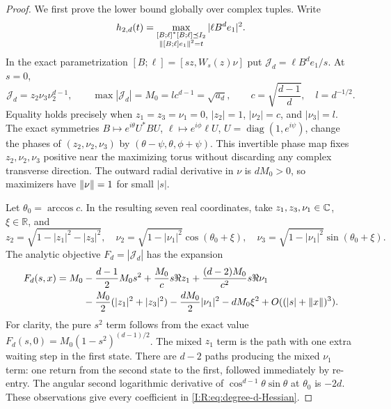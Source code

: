 \begin{proof}
We first prove the lower bound globally over complex tuples.  Write
\[
 h_{2,d}(t)=\max_{\substack{[B;\ell]^*[B;\ell]\preceq I_2\\
                       \left\lVert[B;\ell]e_1\right\rVert^2=t}}
                         |\ell B^d e_1|^2.
\]
In the exact parametrization
$[B;\ell]=[sz,W_s(z)\nu]$ put
$\mathcal J_d=\ell B^de_1/s$.  At $s=0$,
\[
 \mathcal J_d=z_2\nu_3\nu_2^{d-1},\qquad
 \max|\mathcal J_d|=M_0=lc^{d-1}=\sqrt{a_d},\qquad
 c=\sqrt{\frac{d-1}{d}},\quad l=d^{-1/2}.
\]
Equality holds precisely when $z_1=z_3=\nu_1=0$,
$|z_2|=1$, $|\nu_2|=c$, and $|\nu_3|=l$.
The exact symmetries
$B\mapsto e^{i\theta}U^*BU$, $\ell\mapsto e^{i\phi}\ell U$,
$U=\operatorname{diag}(1,e^{i\psi})$, change the phases of
$(z_2,\nu_2,\nu_3)$ by
$(\theta-\psi,\theta,\phi+\psi)$.  This invertible phase map fixes
$z_2,\nu_2,\nu_3$ positive near the maximizing torus without discarding
any complex transverse direction.  The outward
radial derivative in $\nu$ is $dM_0>0$, so maximizers have
$\left\lVert\nu\right\rVert=1$ for small $|s|$.

Let $\theta_0=\arccos c$.  In the resulting seven real coordinates,
take $z_1,z_3,\nu_1\in\mathbb C$, $\xi\in\mathbb R$, and
\[
 z_2=\sqrt{1-|z_1|^2-|z_3|^2},\quad
 \nu_2=\sqrt{1-|\nu_1|^2}\cos(\theta_0+\xi),\quad
 \nu_3=\sqrt{1-|\nu_1|^2}\sin(\theta_0+\xi).
\]
The analytic objective $F_d=|\mathcal J_d|$ has the expansion
\begin{align}
 F_d(s,x)=M_0
 &-\frac{d-1}{2}M_0s^2
   +\frac{M_0}{c}s\Re z_1
   +\frac{(d-2)M_0}{c^2}s\Re\nu_1\notag\\
 &-\frac{M_0}{2}(|z_1|^2+|z_3|^2)
   -\frac{dM_0}{2}|\nu_1|^2-dM_0\xi^2
   +O((|s|+\left\lVert x\right\rVert)^3).
 \label{I:R:eq:degree-d-Hessian}
\end{align}
For clarity, the pure $s^2$ term follows from the exact value
$F_d(s,0)=M_0(1-s^2)^{(d-1)/2}$.  The mixed $z_1$ term is the path
with one extra waiting step in the first state.  There are $d-2$
paths producing the mixed $\nu_1$ term: one return from the second
state to the first, followed immediately by re-entry.  The angular
second logarithmic derivative of
$\cos^{d-1}\theta\sin\theta$ at $\theta_0$ is $-2d$.
These observations give every coefficient in
\eqref{I:R:eq:degree-d-Hessian}.


\end{proof}
